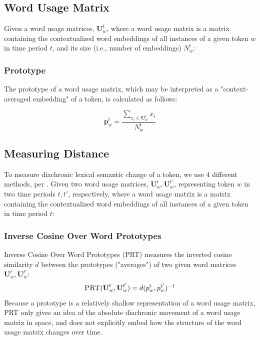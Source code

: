 \documentclass[10pt, a4paper]{article}
\begin{document}
\subsection{Word Usage Matrix}
Given a word usage matrices, $\textbf{U}^{t}_w$, where a word usage matrix is a matrix containing the contextualized word embeddings of all instances of a given token $w$ in time period $t$, and its size (i.e., number of embeddings) $N^t_w$:

\subsubsection{Prototype}
The prototype of a word usage matrix, which may be interpreted as a "context-averaged embedding" of a token, is calculated as follows:

$$\textbf{p}^t_w = \frac{\sum_{x_i \in \textbf{U}^t_w} x_i}{N^t_w}$$

\subsection{Measuring Distance}
\label{distance}
To measure diachronic lexical semantic change of a token, we use 4 different methods, per \cite{Kutuzov2020,Giulianelli2020}. Given two word usage matrices, $\textbf{U}^{t}_w, \textbf{U}^{t'}_w$, representing token $w$ in two time periods $t, t'$, respectively, where a word usage matrix is a matrix containing the contextualized word embeddings of all instances of a given token in time period $t$:

\subsubsection{Inverse Cosine Over Word Prototypes}
Inverse Cosine Over Word Prototypes (PRT) measures the inverted cosine similarity $d$ between the prototypes ("averages") of two given word matrices $\textbf{U}^{t}_w, \textbf{U}^{t'}_w$:
$$\textsc{PRT}(\textbf{U}^{t}_w, \textbf{U}^{t'}_w) = d(p^{t}_w, p^{t'}_w)^{-1}$$
Because a prototype is a relatively shallow representation of a word usage matrix, PRT only gives an idea of the absolute diachronic movement of a word usage matrix in space, and does not explicitly embed how the structure of the word usage matrix changes over time.
\end{document}
